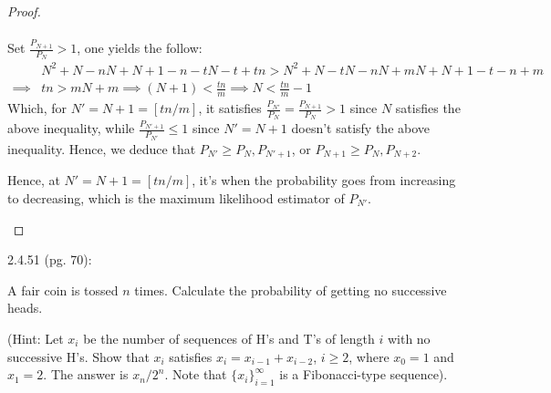 \documentclass{article}
\begin{document}
\begin{proof}
\begin{itemize}
\begin{align}
        \end{align}
        Set $\frac{P_{N+1}}{P_N}>1$, one yields the follow:
        \begin{align}
            &N^2 +N-nN+N+1-n-tN-t+tn > N^2+N-tN-nN+mN +N+1-t-n+m\\
            \implies & tn > mN+m \implies (N+1) < \frac{tn}{m} \implies N<\frac{tn}{m}-1
        \end{align}
        Which, for $N'=N+1 = [tn/m]$, it satisfies $\frac{P_{N'}}{P_N}=\frac{P_{N+1}}{P_N}>1$ since $N$ satisfies the above inequality, while $\frac{P_{N'+1}}{P_{N'}}\leq 1$ since $N'=N+1$ doesn't satisfy the above inequality. Hence, we deduce that $P_{N'}\geq P_N, P_{N'+1}$, or $P_{N+1}\geq P_N,P_{N+2}$.

        Hence, at $N'=N+1=[tn/m]$, it's when the probability goes from increasing to decreasing, which is the maximum likelihood estimator of $P_{N'}$.
    \end{itemize}
\end{proof}

\hfil

\begin{ques}\label{q7}
    2.4.51 (pg. 70):

    A fair coin is tossed $n$ times. Calculate the probability of getting no successive heads.

    (Hint: Let $x_i$ be the number of sequences of H's and T's of length $i$ with no successive H's. Show that $x_i$ satisfies $x_i=x_{i-1}+x_{i-2}$, $i\geq 2$, where $x_0=1$ and $x_1=2$. The answer is $x_n/2^n$. Note that $\{x_i\}_{i=1}^\infty$ is a Fibonacci-type sequence).
\end{ques}
\end{document}
